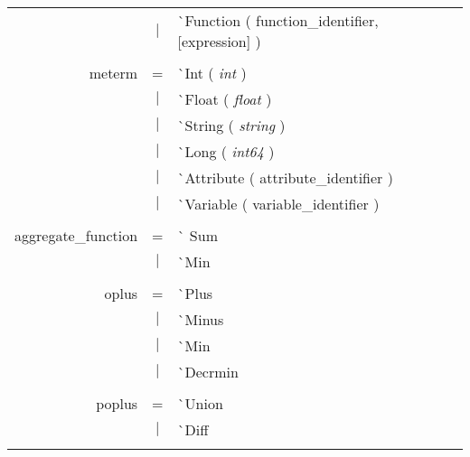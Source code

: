 \documentclass{article}
\begin{document}
\begin{tabular}[ht] {rcl}
&$\lvert$ & \`{}Function ( function\_identifier, [expression] )\\
\\
meterm &=& \`{}Int ( \emph{int} )\\
&$\lvert$ & \`{}Float ( \emph{float} )\\
&$\lvert$ & \`{}String ( \emph{string} )\\
&$\lvert$ & \`{}Long ( \emph{int64} )\\
&$\lvert$ & \`{}Attribute ( attribute\_identifier )\\
&$\lvert$ & \`{}Variable ( variable\_identifier )\\
\\
aggregate\_function &=& \`{} Sum\\
&$\lvert$ & \`{}Min \\
\\
oplus &=& \`{}Plus \\
&$\lvert$ & \`{}Minus \\
&$\lvert$ & \`{}Min\\
&$\lvert$ & \`{}Decrmin\\
\\
poplus &=& \`{}Union\\
&$\lvert$ & \`{}Diff\\
\\
\end{tabular}
\pagebreak
\end{document}
